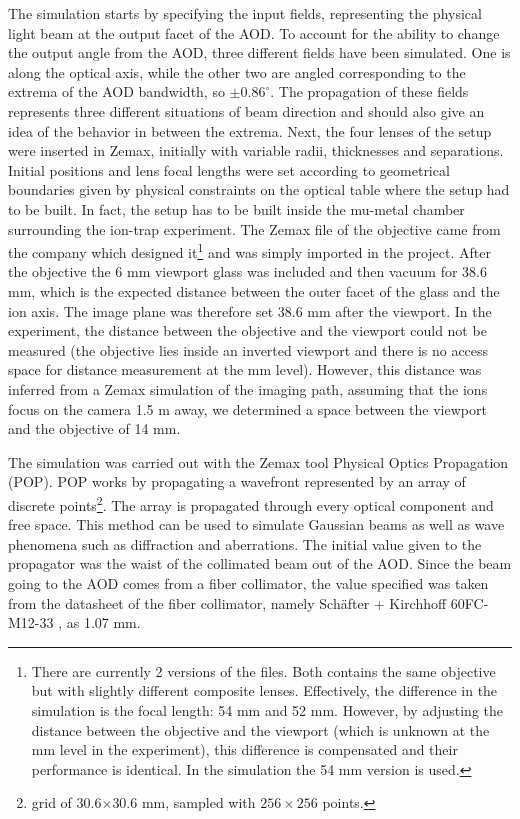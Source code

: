 The simulation starts by specifying the input fields, representing the physical light beam at the output facet of the AOD. To account for the ability to change the output angle from the AOD, three different fields have been simulated. One is along the optical axis, while the other two are angled corresponding to the extrema of the AOD bandwidth, so $\pm0.86^{\circ}$. The propagation of these fields represents three different situations of beam direction and should also give an idea of the behavior in between the extrema. Next, the four lenses of the setup were inserted in Zemax, initially with variable radii, thicknesses and separations. Initial positions and lens focal lengths were set according to geometrical boundaries given by physical constraints on the optical table where the setup had to be built. In fact, the  setup has to be built inside the mu-metal chamber surrounding the ion-trap experiment. The Zemax file of the objective came from the company which designed it\footnote{There are currently 2 versions of the files. Both contains the same objective but with slightly different composite lenses. Effectively, the difference in the simulation is the focal length: 54 mm and 52 mm. However, by adjusting the distance between the objective and the viewport (which is unknown at the mm level in the experiment), this difference is compensated and their performance is identical. In the simulation the 54 mm version is used.} and was simply imported in the project. After the objective the 6 mm viewport glass was included and then vacuum for 38.6 mm, which is the expected distance between the outer facet of the glass and the ion axis. The image plane was therefore set 38.6 mm after the viewport. In the experiment, the distance between the objective and the viewport could not be measured (the objective lies inside an inverted viewport and there is no access space for distance measurement at the mm level). However, this distance was inferred from a Zemax simulation of the imaging path, assuming that the ions focus on the camera 1.5 m away, we determined a space between the viewport and the objective of 14 mm.\par
The simulation was carried out with the Zemax tool Physical Optics Propagation (POP). POP works by propagating a wavefront represented by an array of discrete points\footnote{grid of 30.6$\times$30.6 mm, sampled with $256\times256$ points.}. The array is propagated through every optical component and free space. This method can be used to simulate Gaussian beams as well as wave phenomena such as diffraction and aberrations. The initial value given to the propagator was the waist of the collimated beam out of the AOD. Since the beam going to the AOD comes from a fiber collimator, the value specified was taken from the datasheet of the fiber collimator, namely Sch\"after + Kirchhoff 60FC-M12-33 \cite{fibercollimator}, as 1.07 mm.
